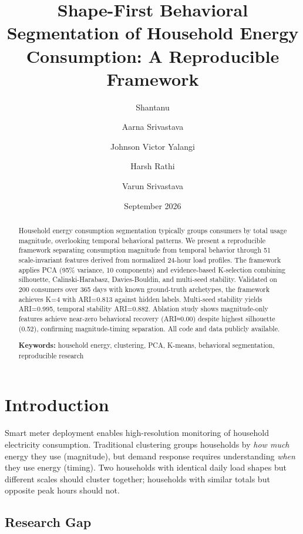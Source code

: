 \documentclass[11pt,a4paper]{article}
\title{\textbf{Shape-First Behavioral Segmentation of Household Energy Consumption: A Reproducible Framework}}
\author{
  Shantanu \and Aarna Srivastava \and Johnson Victor Yalangi \and Harsh Rathi \and Varun Srivastava\\
  [Institution]
}
\date{September 2026}
\begin{document}
\maketitle

\begin{abstract}
Household energy consumption segmentation typically groups consumers by total usage magnitude, overlooking temporal behavioral patterns. We present a reproducible framework separating consumption magnitude from temporal behavior through 51 scale-invariant features derived from normalized 24-hour load profiles. The framework applies PCA (95\% variance, 10 components) and evidence-based K-selection combining silhouette, Calinski-Harabasz, Davies-Bouldin, and multi-seed stability. Validated on 200 consumers over 365 days with known ground-truth archetypes, the framework achieves K=4 with ARI=0.813 against hidden labels. Multi-seed stability yields ARI=0.995, temporal stability ARI=0.882. Ablation study shows magnitude-only features achieve near-zero behavioral recovery (ARI≈0.00) despite highest silhouette (0.52), confirming magnitude-timing separation. All code and data publicly available.

\textbf{Keywords:} household energy, clustering, PCA, K-means, behavioral segmentation, reproducible research
\end{abstract}

\section{Introduction}

Smart meter deployment enables high-resolution monitoring of household electricity consumption. Traditional clustering groups households by \emph{how much} energy they use (magnitude), but demand response requires understanding \emph{when} they use energy (timing). Two households with identical daily load shapes but different scales should cluster together; households with similar totals but opposite peak hours should not.

\subsection{Research Gap}
\end{document}
